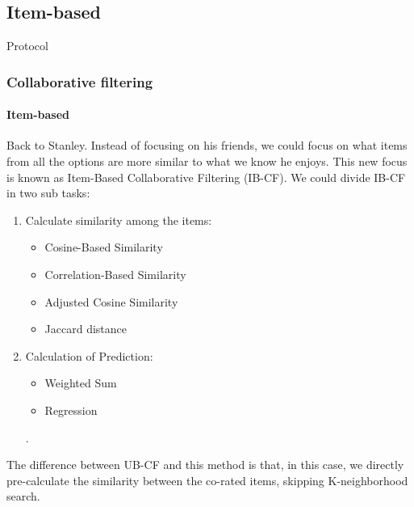 \subsection{Item-based}
\begin{frame}{Protocol}
	\frametitle{Collaborative filtering}
	\framesubtitle{Item-based}
	Back to Stanley. Instead of focusing on his friends, we could focus on what items from all the options are more similar to what we know he enjoys. This new focus is known as Item-Based Collaborative Filtering (IB-CF).
    We could divide IB-CF in two sub tasks:
    \vspace{0.3cm}
    \begin{enumerate}
        \item Calculate similarity among the items:
        \begin{itemize}
            \item Cosine-Based Similarity
            \item Correlation-Based Similarity
            \item Adjusted Cosine Similarity
            \item Jaccard distance
        \end{itemize}
        \newpage
        \item Calculation of Prediction:
        \begin{itemize}
            \item Weighted Sum
            \item Regression
        \end{itemize}.
    \end{enumerate}
    The difference between UB-CF and this method is that, in this case, we directly pre-calculate the similarity between the co-rated items, skipping K-neighborhood search.
\end{frame}
